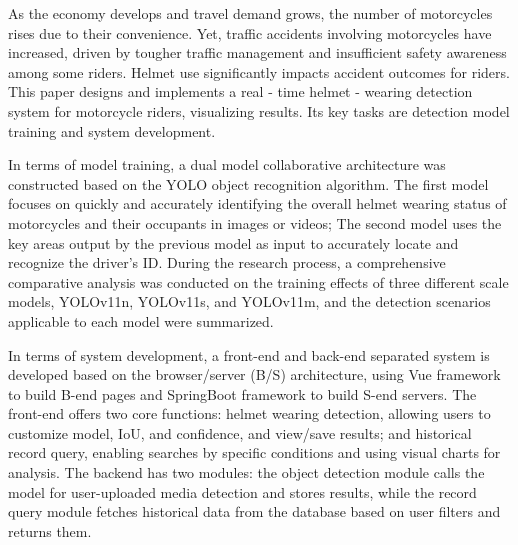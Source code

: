 As the economy develops and travel demand grows, the number of motorcycles rises due to their convenience. Yet, traffic accidents involving motorcycles have increased, driven by tougher traffic management and insufficient safety awareness among some riders. Helmet use significantly impacts accident outcomes for riders. This paper designs and implements a real - time helmet - wearing detection system for motorcycle riders, visualizing results. Its key tasks are detection model training and system development.

In terms of model training, a dual model collaborative architecture was constructed based on the YOLO object recognition algorithm. The first model focuses on quickly and accurately identifying the overall helmet wearing status of motorcycles and their occupants in images or videos; The second model uses the key areas output by the previous model as input to accurately locate and recognize the driver's ID. During the research process, a comprehensive comparative analysis was conducted on the training effects of three different scale models, YOLOv11n, YOLOv11s, and YOLOv11m, and the detection scenarios applicable to each model were summarized.

In terms of system development, a front-end and back-end separated system is developed based on the browser/server (B/S) architecture, using Vue framework to build B-end pages and SpringBoot framework to build S-end servers. The front-end offers two core functions: helmet wearing detection, allowing users to customize model, IoU, and confidence, and view/save results; and historical record query, enabling searches by specific conditions and using visual charts for analysis. The backend has two modules: the object detection module calls the model for user-uploaded media detection and stores results, while the record query module fetches historical data from the database based on user filters and returns them.
